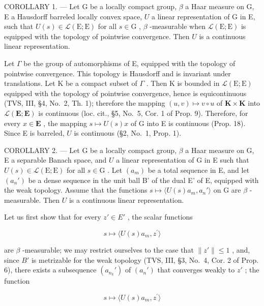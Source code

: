 COROLLARY 1. --- Let G be a locally compact group, \(\beta\) a Haar measure on G, E a Hausdorff barreled locally convex space, \(U\) a linear representation of G in E, such that \(U(s) \in \mathcal{L}(\mathrm{E};\mathrm{E})\) for all \(s \in \mathrm{G}\) , \(\beta\) -measurable when \(\mathcal{L}(\mathrm{E};\mathrm{E})\) is equipped with the topology of pointwise convergence. Then \(U\) is a continuous linear representation.

Let \(\Gamma\) be the group of automorphisms of E, equipped with the topology of pointwise convergence. This topology is Hausdorff and is invariant under translations. Let K be a compact subset of \(\Gamma\) . Then K is bounded in \(\mathcal{L}(\mathrm{E};\mathrm{E})\) equipped with the topology of pointwise convergence, hence is equicontinuous (TVS, III, §4, No.~2, Th. 1); therefore the mapping \((u,v)\mapsto v\circ u\) of \(\mathbf{K}\times \mathbf{K}\) into \(\mathcal{L}(\mathbf{E};\mathbf{E})\) is continuous (loc. cit., §5, No.~5, Cor. 1 of Prop. 9). Therefore, for every \(x\in \mathbf{E}\) , the mapping \(s\mapsto U(s)x\) of G into E is continuous (Prop. 18). Since E is barreled, \(U\) is continuous (§2, No.~1, Prop. 1).

COROLLARY 2. --- Let G be a locally compact group, \(\beta\) a Haar measure on G, E a separable Banach space, and \(U\) a linear representation of G in E such that \(U(s) \in \mathcal{L}(\mathrm{E};\mathrm{E})\) for all \(s \in \mathrm{G}\) . Let \((a_m)\) be a total sequence in E, and let \((a_n')\) be a dense sequence in the unit ball B' of the dual E' of E, equipped with the weak topology. Assume that the functions \(s \mapsto \langle U(s)a_m, a_n' \rangle\) on G are \(\beta\) -measurable. Then \(U\) is a continuous linear representation.

Let us first show that for every \(z' \in E'\) , the scalar functions

\[
s \mapsto \langle U (s) a _ {m}, z ^ {\prime} \rangle
\]

are \(\beta\) -measurable; we may restrict ourselves to the case that \(\|z'\| \leqslant 1\) , and, since \(B'\) is metrizable for the weak topology (TVS, III, §3, No.~4, Cor. 2 of Prop. 6), there exists a subsequence \((a_{n_k}')\) of \((a_n')\) that converges weakly to \(z'\) ; the function

\[
s \mapsto \langle U (s) a _ {m}, z ^ {\prime} \rangle
\]

